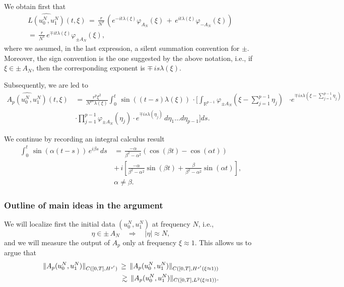 \documentclass{beamer}
\numberwithin{equation}{section}
\begin{document}
\begin{frame}
We obtain first that
\begin{gather*}
\widehat{L(u^N_0,u^N_1)}(t,\xi)\,=\, \frac{r}{N^{s}}\,\left(e^{-it\lambda(\xi)}\varphi_{A_N}(\xi)\,+\,e^{it\lambda(\xi)}\varphi_{-A_N}(\xi)\right)\,
\\
=\,\frac{r}{N^{s}}\,e^{\mp it\lambda(\xi)}\varphi_{\pm A_N}(\xi),
\end{gather*}
where we assumed, in the last expression, a silent summation convention for $\pm$. Moreover, the sign convention is the one suggested by the above notation, i.e., if $\xi\in \pm \,A_N$, then the corresponding exponent is $\mp \,is\lambda(\xi)$.
\end{frame}
\begin{frame}

Subsequently, we are led to
\begin{align*}
\widehat{A_p(u^N_0,u^N_1)}(t,\xi)\,
& =\, \frac{r^p \xi^2}{N^{ps}\lambda(\xi)}\int_0^t \,\sin((t-s) \lambda(\xi))\,\cdot
\bigg[\int_{\mathbb{R}^{p-1}}\varphi_{\pm A_N}(\xi-\sum_{j=1}^{p-1} \eta_j)&\cdot e^{\mp is\lambda(\xi-\sum_{j=1}^{p-1}\eta_j)}\,
\\
& \cdot \prod_{j=1}^{p-1}\varphi_{\pm A_N}(\eta_j)\cdot e^{\mp is\lambda(\eta_j)}\,d\eta_1\ldots d\eta_{p-1}\bigg]ds.
\end{align*}
\end{frame}
\begin{frame}
We continue by recording an integral calculus result
\begin{align*}
\int_0^t\,\sin(\alpha(t-s))\,e^{i\beta s}\,ds\,&=\,\frac{-\alpha}{\beta^2-\alpha^2}(\cos (\beta t)-\cos (\alpha t))\\
&+\,i\left[\frac{-\alpha}{\beta^2-\alpha^2}\sin (\beta t) + \frac{\beta}{\beta^2-\alpha^2}\sin (\alpha t)\right],
\\
& \alpha\neq \beta.
\label{calc}
\end{align*}
\end{frame}
\begin{frame}
\frametitle{Outline of main ideas in the argument} 
We will localize first the initial data $(u^N_0,u^N_1)$ at frequency $N$, i.e.,
\[
\eta\in \pm \,A_N\quad \Longrightarrow \quad |\eta| \approx N,\]
\pause
and we will measure the output of $A_p$ only at frequency $\xi \approx 1$. This allows us to argue that
\begin{equation*}
\aligned
\|A_{p}(u_0^N,u_1^N)\|_{C([0,T], H^{s'})}\,\geq\, \|A_{p}(u_0^N,u_1^N)\|_{C([0,T], H^{s'}(\xi \approx 1))}\\
\gtrsim\, \|A_{p}(u_0^N,u_1^N)\|_{C([0,T], L^2(\xi \approx 1))}.
\endaligned
\label{aphs}
\end{equation*}
\end{frame}
\end{document}
